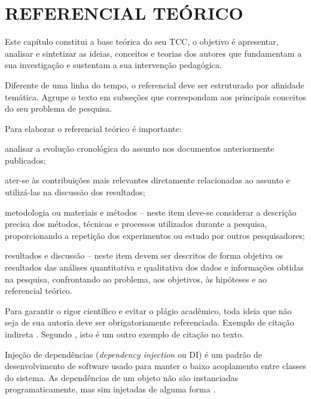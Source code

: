 \chapter{REFERENCIAL TEÓRICO}
Este capítulo constitui a base teórica do seu TCC, o objetivo é apresentar, analisar e sintetizar as ideias, conceitos e teorias dos autores que fundamentam a sua investigação e sustentam a sua intervenção pedagógica.

Diferente de uma linha do tempo, o referencial deve ser estruturado por afinidade temática. Agrupe o texto em subseções que correspondam aos principais conceitos do seu problema de pesquisa.

Para elaborar o referencial teórico é importante:
\begin{uemaball}
    \item analisar a evolução cronológica do assunto nos documentos anteriormente publicados;
    \item ater-se às contribuições mais relevantes diretamente relacionadas ao assunto e utilizá-las na discussão dos resultados;
    \item metodologia ou materiais e métodos -- neste item deve-se considerar a descrição precisa dos métodos, técnicas e processos utilizados durante a pesquisa, proporcionando a repetição dos experimentos ou estudo por outros pesquisadores;
    \item resultados e discussão -- neste item devem ser descritos de forma objetiva os resultados das análises quantitativa e qualitativa dos dados e informações obtidas na pesquisa, confrontando ao problema, aos objetivos, às hipóteses e ao referencial teórico.
\end{uemaball}

Para garantir o rigor científico e evitar o plágio acadêmico, toda ideia que não seja de sua autoria deve ser obrigatoriamente referenciada. Exemplo de citação indireta \cite{towfic2022benchmarking}. Segundo , isto é um outro exemplo de citação no texto.

\begin{citacao}
Injeção de dependências (\textit{dependency injection} ou DI) é um padrão de
desenvolvimento de software usado para manter o baixo acoplamento entre classes do
sistema. As dependências de um objeto não são instanciadas programaticamente, mas
sim injetadas de alguma forma \cite{chambers2021macbook}.
\end{citacao}
